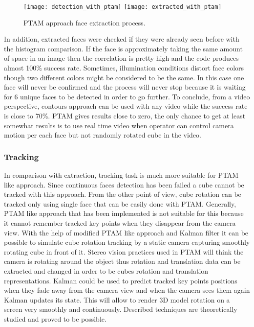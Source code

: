\documentclass[../../main.tex]{subfiles}
\begin{document}
\begin{figure} [ht!]
    \begin{center}
        \texttt{[image: detection\_with\_ptam]}
        \texttt{[image: extracted\_with\_ptam]}
        \caption{\ac{PTAM} approach face extraction process.}
        \label{fig:ptam_approach_face_detection}
    \end{center}
\end{figure}

In addition, extracted faces were checked if they were already seen before with the histogram comparison. If the face is approximately taking the same amount of space in an image then the correlation is pretty high and the code produces almost 100\% success rate. Sometimes, illumination conditions distort face colors though two different colors might be considered to be the same. In this case one face will never be confirmed and the process will never stop because it is waiting for 6 unique faces to be detected in order to go further.
To conclude, from a video perspective, contours approach can be used with any video while the success rate is close to 70\%. \ac{PTAM} gives results close to zero, the only chance to get at least somewhat results is to use real time video when operator can control camera motion per each face but not randomly rotated cube in the video.

\subsubsection*{Tracking}

In comparison with extraction, tracking task is much more suitable for \ac{PTAM} like approach. Since continuous faces detection has been failed a cube cannot be tracked with this approach. From the other point of view, cube rotation can be tracked only using single face that can be easily done with \ac{PTAM}. Generally, \ac{PTAM} like approach that has been implemented is not suitable for this because it cannot remember tracked key points when they disappear from the camera view. With the help of modified \ac{PTAM} like approach and Kalman filter it can be possible to simulate cube rotation tracking by a static camera capturing smoothly rotating cube in front of it. Stereo vision practices used in \ac{PTAM} will think the camera is rotating around the object thus rotation and translation data can be extracted and changed in order to be cubes rotation and translation representations. Kalman could be used to predict tracked key points positions when they fade away from the camera view and when the camera sees them again Kalman updates its state. This will allow to render 3D model rotation on a screen very smoothly and continuously. Described techniques are theoretically studied and proved to be possible.
\end{document}
